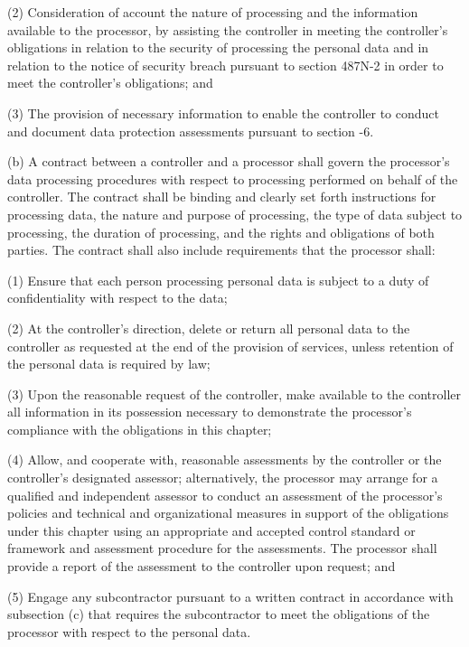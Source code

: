      (2)  Consideration of account the nature of processing and the information available to the processor, by assisting the controller in meeting the controller's obligations in relation to the security of processing the personal data and in relation to the notice of security breach pursuant to section 487N-2 in order to meet the controller's obligations; and

     (3)  The provision of necessary information to enable the controller to conduct and document data protection assessments pursuant to section    -6.

     (b)  A contract between a controller and a processor shall govern the processor's data processing procedures with respect to processing performed on behalf of the controller.  The contract shall be binding and clearly set forth instructions for processing data, the nature and purpose of processing, the type of data subject to processing, the duration of processing, and the rights and obligations of both parties.  The contract shall also include requirements that the processor shall:

     (1)  Ensure that each person processing personal data is subject to a duty of confidentiality with respect to the data;

     (2)  At the controller's direction, delete or return all personal data to the controller as requested at the end of the provision of services, unless retention of the personal data is required by law;

     (3)  Upon the reasonable request of the controller, make available to the controller all information in its possession necessary to demonstrate the processor's compliance with the obligations in this chapter;

     (4)  Allow, and cooperate with, reasonable assessments by the controller or the controller's designated assessor; alternatively, the processor may arrange for a qualified and independent assessor to conduct an assessment of the processor's policies and technical and organizational measures in support of the obligations under this chapter using an appropriate and accepted control standard or framework and assessment procedure for the assessments.  The processor shall provide a report of the assessment to the controller upon request; and

     (5)  Engage any subcontractor pursuant to a written contract in accordance with subsection (c) that requires the subcontractor to meet the obligations of the processor with respect to the personal data.

